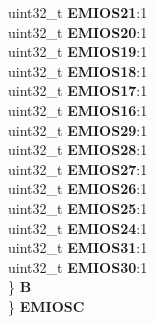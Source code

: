 \begin{DoxyCompactItemize}
\begin{tabbing}
\>\>uint32\_t {\bfseries EMIOS21}:1\\
\>\>uint32\_t {\bfseries EMIOS20}:1\\
\>\>uint32\_t {\bfseries EMIOS19}:1\\
\>\>uint32\_t {\bfseries EMIOS18}:1\\
\>\>uint32\_t {\bfseries EMIOS17}:1\\
\>\>uint32\_t {\bfseries EMIOS16}:1\\
\>\>uint32\_t {\bfseries EMIOS29}:1\\
\>\>uint32\_t {\bfseries EMIOS28}:1\\
\>\>uint32\_t {\bfseries EMIOS27}:1\\
\>\>uint32\_t {\bfseries EMIOS26}:1\\
\>\>uint32\_t {\bfseries EMIOS25}:1\\
\>\>uint32\_t {\bfseries EMIOS24}:1\\
\>\>uint32\_t {\bfseries EMIOS31}:1\\
\>\>uint32\_t {\bfseries EMIOS30}:1\\
\>\} {\bfseries B}\\
\} {\bfseries EMIOSC}\\


\end{tabbing}
\end{DoxyCompactItemize}
